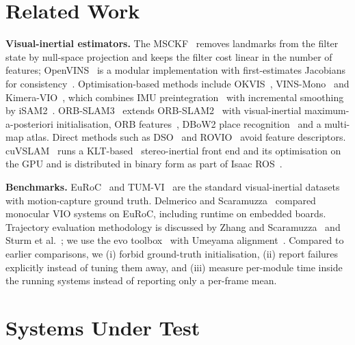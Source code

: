 \documentclass[conference,a4paper]{IEEEtran}
\begin{document}
\section{Related Work}

\textbf{Visual-inertial estimators.} The MSCKF~\cite{mourikis2007} removes landmarks from the
filter state by null-space projection and keeps the filter cost linear in the number of
features; OpenVINS~\cite{openvins} is a modular implementation with first-estimates Jacobians
for consistency~\cite{huang2011fej}. Optimisation-based methods include
OKVIS~\cite{leutenegger2015okvis}, VINS-Mono~\cite{qin2018vinsmono} and
Kimera-VIO~\cite{kimeravio}, which combines IMU preintegration~\cite{forster2017} with
incremental smoothing by iSAM2~\cite{dellaert2012isam2}. ORB-SLAM3~\cite{orbslam3} extends
ORB-SLAM2~\cite{murartal2017orbslam2} with visual-inertial maximum-a-posteriori initialisation,
ORB features~\cite{rublee2011orb}, DBoW2 place recognition~\cite{galvez2012dbow2} and a
multi-map atlas. Direct methods such as DSO~\cite{engel2017dso} and
ROVIO~\cite{bloesch2017rovio} avoid feature descriptors. cuVSLAM~\cite{korovko2025cuvslam}
runs a KLT-based~\cite{lucaskanade1981,bouguet2001klt} stereo-inertial front end and its
optimisation on the GPU and is distributed in binary form as part of Isaac ROS~\cite{cuvslam}.

\textbf{Benchmarks.} EuRoC~\cite{euroc} and TUM-VI~\cite{schubert2018tumvi} are the standard
visual-inertial datasets with motion-capture ground truth. Delmerico and
Scaramuzza~\cite{delmerico2018benchmark} compared monocular VIO systems on EuRoC, including
runtime on embedded boards. Trajectory evaluation methodology is discussed by Zhang and
Scaramuzza~\cite{zhang2018tutorial} and Sturm et al.~\cite{sturm2012tum}; we use the evo
toolbox~\cite{grupp2017evo} with Umeyama alignment~\cite{umeyama1991}. Compared to earlier
comparisons, we (i) forbid ground-truth initialisation, (ii) report failures explicitly instead
of tuning them away, and (iii) measure per-module time inside the running systems instead of
reporting only a per-frame mean.

\section{Systems Under Test}
\end{document}

